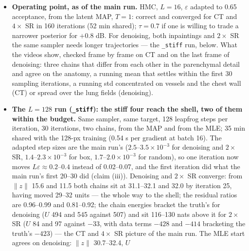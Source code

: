 \documentclass[11pt]{article}
\begin{document}
\begin{itemize}
        the inpaintings where the std is confined to the missing pixels)
        shrink under $\tau = 0.7$ where the cooling acted (CT 0.038 to
        0.031, $4\times$ SR 0.057 to 0.041) and not where it did not
        (denoising 0.057 to 0.053, box and random unchanged), as a
        narrower prior should make them.
  \item \textbf{Operating point, as of the main run.} HMC, $L = 16$,
        $\varepsilon$ adapted to 0.65 acceptance, from the latent MAP,
        $T = 1$: correct and converged for CT and $4\times$ SR in 160
        iterations (52 min shared); $\tau = 0.7$ if one is willing to
        trade a narrower posterior for $+0.8$ dB. For denoising, both
        inpaintings and $2\times$ SR the same sampler needs longer
        trajectories --- the \texttt{\_stiff} run, below. What the videos
        show, checked frame by frame on CT and on the last frame of
        denoising: three chains that differ from each other in the
        parenchymal detail and agree on the anatomy, a running mean that
        settles within the first 30 sampling iterations, a running std
        concentrated on vessels and the chest wall (CT) or spread over the
        lung fields (denoising).
  \item \textbf{The $L = 128$ run (\texttt{\_stiff}): the stiff four reach
        the shell, two of them within the budget.} Same sampler, same
        target, 128 leapfrog steps per iteration, 30 iterations, two
        chains, from the MAP and from the MLE; 35 min shared with the
        128-px training (0.54 s per gradient at batch 16). The adapted
        step sizes are the main run's ($2.5$--$3.5 \times 10^{-3}$ for
        denoising and $2\times$ SR, $1.4$--$2.3 \times 10^{-3}$ for box,
        $1.7$--$2.0 \times 10^{-3}$ for random), so one iteration now
        moves $L\varepsilon \approx 0.2$--$0.4$ instead of 0.02--0.07, and
        the first iteration did what the main run's first 20--30 did
        (claim (iii)). Denoising and $2\times$ SR converge: from $\|z\|$
        15.6 and 11.5 both chains sit at 31.1--32.1 and 32.0 by iteration
        25, having moved 29--32 units --- the whole way to the shell; the
        residual ratios are 0.96--0.99 and 0.81--0.92; the chain energies
        bracket the truth's for denoising ($U$ 494 and 545 against 507)
        and sit 116--130 nats above it for $2\times$ SR ($U$ 84 and 97
        against $-33$, with data terms $-428$ and $-414$ bracketing the
        truth's $-423$) --- the CT and $4\times$ SR picture of the main
        run. The MLE start agrees on denoising: $\|z\|$ 30.7--32.4, $U$

\end{itemize}
\end{document}
